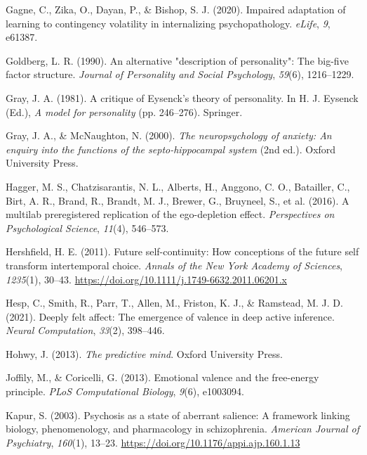 \documentclass[
  jou,
  floatsintext,
  longtable,
  nolmodern,
  notxfonts,
  notimes,
  12pt,
  colorlinks=true,linkcolor=blue,citecolor=blue,urlcolor=blue]{apa7}
\newlength{\cslhangindent}
\newenvironment{CSLReferences}[2] %
 {\begin{list}{}{%
  \setlength{\itemindent}{0pt}
  \setlength{\leftmargin}{0pt}
  \setlength{\parsep}{0pt}
  \ifodd #1
   \setlength{\leftmargin}{\cslhangindent}
   \setlength{\itemindent}{-1\cslhangindent}
  \fi
  \setlength{\itemsep}{#2\baselineskip}}}
 {\end{list}}
\begin{document}
\begin{CSLReferences}{1}{0}
Gagne, C., Zika, O., Dayan, P., \& Bishop, S. J. (2020). Impaired
adaptation of learning to contingency volatility in internalizing
psychopathology. \emph{eLife}, \emph{9}, e61387.

Goldberg, L. R. (1990). An alternative "description of personality": The
big-five factor structure. \emph{Journal of Personality and Social
Psychology}, \emph{59}(6), 1216--1229.

Gray, J. A. (1981). A critique of {Eysenck's} theory of personality. In
H. J. Eysenck (Ed.), \emph{A model for personality} (pp. 246--276).
Springer.

Gray, J. A., \& McNaughton, N. (2000). \emph{The neuropsychology of
anxiety: An enquiry into the functions of the septo-hippocampal system}
(2nd ed.). Oxford University Press.

{Hagger, M. S., Chatzisarantis, N. L., Alberts, H., Anggono, C. O.,
Batailler, C., Birt, A. R., Brand, R., Brandt, M. J., Brewer, G.,
Bruyneel, S., et al.} (2016). A multilab preregistered replication of
the ego-depletion effect. \emph{Perspectives on Psychological Science},
\emph{11}(4), 546--573.

Hershfield, H. E. (2011). Future self-continuity: How conceptions of the
future self transform intertemporal choice. \emph{Annals of the New York
Academy of Sciences}, \emph{1235}(1), 30--43.
\url{https://doi.org/10.1111/j.1749-6632.2011.06201.x}

Hesp, C., Smith, R., Parr, T., Allen, M., Friston, K. J., \& Ramstead,
M. J. D. (2021). Deeply felt affect: The emergence of valence in deep
active inference. \emph{Neural Computation}, \emph{33}(2), 398--446.

Hohwy, J. (2013). \emph{The predictive mind}. Oxford University Press.

Joffily, M., \& Coricelli, G. (2013). Emotional valence and the
free-energy principle. \emph{PLoS Computational Biology}, \emph{9}(6),
e1003094.

Kapur, S. (2003). Psychosis as a state of aberrant salience: A framework
linking biology, phenomenology, and pharmacology in schizophrenia.
\emph{American Journal of Psychiatry}, \emph{160}(1), 13--23.
\url{https://doi.org/10.1176/appi.ajp.160.1.13}


\end{CSLReferences}
\end{document}

